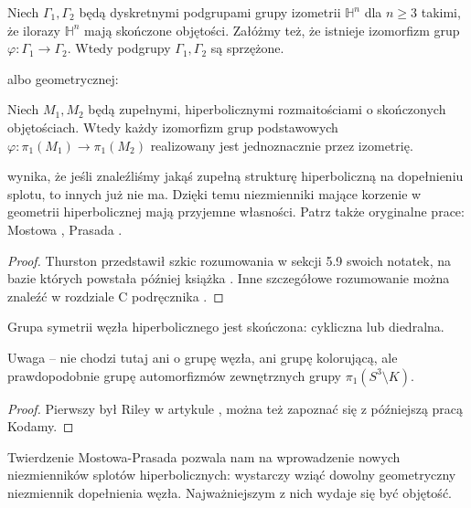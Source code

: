 \begin{theorem}
    Niech $\Gamma_1, \Gamma_2$ będą dyskretnymi podgrupami grupy izometrii $\mathbb H^n$ dla $n \ge 3$ takimi, że ilorazy $\mathbb H^n$ mają skończone objętości.
    Załóżmy też, że istnieje izomorfizm grup $\varphi \colon \Gamma_1 \to \Gamma_2$.
    Wtedy podgrupy $\Gamma_1, \Gamma_2$ są sprzężone.
\end{theorem}

albo geometrycznej:

\begin{theorem}
    Niech $M_1, M_2$ będą zupełnymi, hiperbolicznymi rozmaitościami o skończonych objętościach.
    Wtedy każdy izomorfizm grup podstawowych $\varphi \colon \pi_1(M_1) \to \pi_1(M_2)$ realizowany jest jednoznacznie przez izometrię.
\end{theorem}

wynika, że jeśli znaleźliśmy jakąś zupełną strukturę hiperboliczną na dopełnieniu splotu, to innych już nie ma. 
Dzięki temu niezmienniki mające korzenie w geometrii hiperbolicznej mają przyjemne własności.
Patrz także oryginalne prace: Mostowa \cite{mostow73}, Prasada \cite{prasad73}.

\begin{proof}
    Thurston przedstawił szkic rozumowania w sekcji 5.9 swoich notatek, na bazie których powstała później książka \cite{thurston97}.
    Inne szczegółowe rozumowanie można znaleźć w rozdziale C podręcznika \cite{benedetti92}.
\end{proof}


\begin{proposition}
    Grupa symetrii węzła hiperbolicznego jest skończona: cykliczna lub diedralna.
\end{proposition}

Uwaga -- nie chodzi tutaj ani o grupę węzła, ani grupę kolorującą, ale prawdopodobnie grupę automorfizmów zewnętrznych grupy $\pi_1(S^3 \setminus K)$.

\begin{proof}
    Pierwszy był Riley w artykule \cite{riley75}, można też zapoznać się z późniejszą pracą \cite{kodama92} Kodamy.
\end{proof}


Twierdzenie Mostowa-Prasada pozwala nam na wprowadzenie nowych niezmienników splotów hiperbolicznych: wystarczy wziąć dowolny geometryczny niezmiennik dopełnienia węzła.
Najważniejszym z nich wydaje się być objętość.

